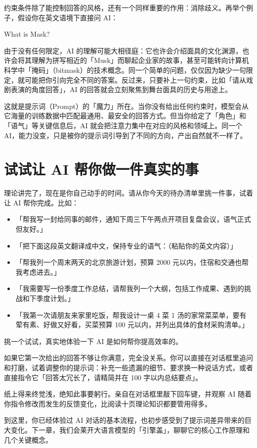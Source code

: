 约束条件除了能控制回答的风格，还有一个同样重要的作用：消除歧义。再举个例子，假设你在英文语境下直接问 AI：

\begin{promptbox}
What is Mask?
\end{promptbox}

由于没有任何限定，AI 的理解可能大相径庭：它也许会介绍面具的文化渊源，也许会将其理解为拼写相近的「Musk」而聊起企业家的故事，甚至可能转向计算机科学中「掩码」（bitmask）的技术概念。同一个简单的问题，仅仅因为缺少一句限定，就可能把你引向完全不同的答案。反过来，只要补上一句约束，比如「请从戏剧表演的角度回答」，AI 的回答就会立刻聚焦到舞台面具的历史与用途上。

这就是提示词（Prompt）的「魔力」所在。当你没有给出任何约束时，模型会从它海量的训练数据中匹配最通用、最安全的回答方式。但当你给定了「角色」和「语气」等关键信息后，AI 就会把注意力集中在对应的风格和领域上。同一个 AI，能力没变，只是被你的提示词引导到了不同的方向，产出自然就不一样了。

\section{试试让 AI 帮你做一件真实的事}

理论讲完了，现在是你自己动手的时间。请从你今天的待办清单里挑一件事，试着让 AI 帮你完成。比如：

\begin{itemize}
  \item 「帮我写一封给同事的邮件，通知下周三下午两点开项目复盘会议，语气正式但友好。」
  \item 「把下面这段英文翻译成中文，保持专业的语气：（粘贴你的英文内容）」
  \item 「帮我列一个周末两天的北京旅游计划，预算 2000 元以内，住宿和交通也帮我考虑进去。」
  \item 「我需要写一份季度工作总结，请帮我列一个大纲，包括工作成果、遇到的挑战和下季度计划。」
  \item 「我第一次请朋友来家里吃饭，帮我设计一桌 4 菜 1 汤的家常菜菜单，要有荤有素、好做又好看，买菜预算 100 元以内，并列出具体的食材采购清单。」
\end{itemize}

挑一个试试，真实地体验一下 AI 是如何帮你提高效率的。

如果它第一次给出的回答不够让你满意，完全没关系。你可以直接在对话框里追问和打磨，试着调整你的提示词：补充一些遗漏的细节、要求换一种说话方式，或者直接指令它「回答太冗长了，请精简并在 100 字以内总结要点」。

\begin{tipbox}
纸上得来终觉浅，绝知此事要躬行。亲自在对话框里敲下回车键，并观察 AI 随着你指令修改而发生的反馈变化，比阅读十页理论知识都要管用得多。
\end{tipbox}

到这里，你已经体验过 AI 对话的基本流程，也初步感受到了提示词差异带来的巨大变化。下一章，我们会莱开大语言模型的「引擎盖」，聊聊它的核心工作原理和几个关键概念。
